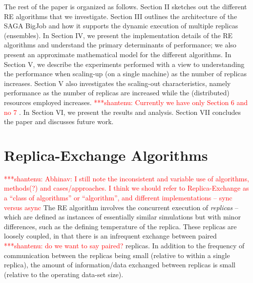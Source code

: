 \documentclass{rspublic}
\newcommand{\jhanote}[1]{ {\textcolor{red} { ***shantenu: #1 }}}
\newcommand{\alnote}[1]{ {\textcolor{blue} { ***andre: #1 }}}
\newcommand{\alnote}[1]{}
\newcommand{\jhanote}[1]{}
\begin{document}
The rest of the paper is organized as follows. Section II sketches out
the different RE algorithms that we investigate. Section III outlines
the architecture of the SAGA BigJob and how it supports the dynamic
execution of multiple replicas (ensembles). In Section IV, we present
the implementation details of the RE algorithms and understand
the primary determinants of performance; we also present
an approximate mathematical model for the different algorithms.
In Section V, we describe the experiments performed with a view to
understanding the performance when scaling-up (on a single machine) as
the number of replicas increases. Section V also investigates the
scaling-out characteristics, namely performance as the number of
replicas are increased while the (distributed) resources employed
increases. %
\jhanote{Currently we have only Section 6 and no 7}. In Section VI, we
present the results and analysis.  Section VII concludes the paper and
discusses future work.


\section{Replica-Exchange Algorithms}
\label{sec:repex-approach}
\jhanote{Abhinav: I still note the inconsistent and variable use of
  algorithms, methods(?) and cases/approaches. I think we should refer
  to Replica-Exchange as a ``class of algorithms'' or ``algorithm'',
  and different implementations -- sync versus async} The RE algorithm
involves the concurrent execution of \emph{replicas} -- which are
defined as instances of essentially similar simulations but with minor
differences, such as the defining temperature of the replica. These
replicas are loosely coupled, in that there is an infrequent exchange
between paired \jhanote{do we want to say paired?}  replicas. In
addition to the frequency of communication between the replicas being
small (relative to within a single replica), the amount of
information/data exchanged between replicas is small (relative to the
operating data-set size).

\end{document}
